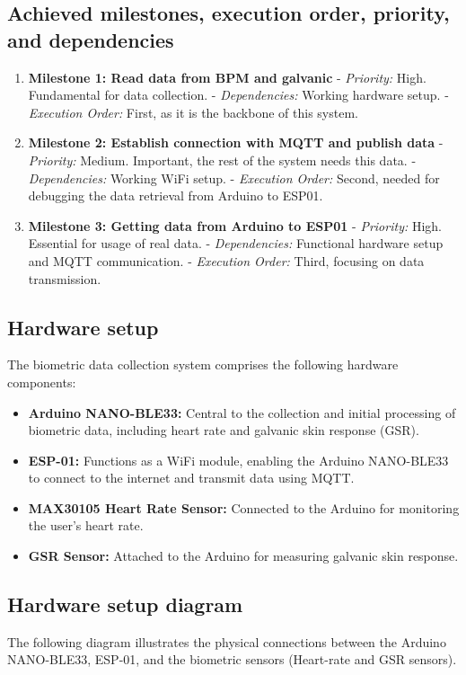 \documentclass{article}
\begin{document}
\subsection{Achieved milestones, execution order, priority, and dependencies}
\begin{enumerate}
    \item \textbf{Milestone 1: Read data from BPM and galvanic}
       - \textit{Priority:} High. Fundamental for data collection.
       - \textit{Dependencies:} Working hardware setup.
       - \textit{Execution Order:} First, as it is the backbone of this system.

    \item \textbf{Milestone 2: Establish connection with MQTT and publish data}
       - \textit{Priority:} Medium. Important, the rest of the system needs this data.
       - \textit{Dependencies:} Working WiFi setup.
       - \textit{Execution Order:} Second, needed for debugging the data retrieval from Arduino to ESP01.

    \item \textbf{Milestone 3: Getting data from Arduino to ESP01}
       - \textit{Priority:} High. Essential for usage of real data.
       - \textit{Dependencies:} Functional hardware setup and MQTT communication.
       - \textit{Execution Order:} Third, focusing on data transmission.
\end{enumerate}

\subsection{Hardware setup}
The biometric data collection system comprises the following hardware components:
\begin{itemize}
    \item \textbf{Arduino NANO-BLE33:} Central to the collection and initial processing of biometric data, including heart rate and galvanic skin response (GSR).
    \item \textbf{ESP-01:} Functions as a WiFi module, enabling the Arduino NANO-BLE33 to connect to the internet and transmit data using MQTT.
    \item \textbf{MAX30105 Heart Rate Sensor:} Connected to the Arduino for monitoring the user's heart rate.
    \item \textbf{GSR Sensor:} Attached to the Arduino for measuring galvanic skin response.
\end{itemize}

\subsection{Hardware setup diagram}
The following diagram illustrates the physical connections between the Arduino NANO-BLE33, ESP-01, and the biometric sensors (Heart-rate and GSR sensors).
\end{document}

